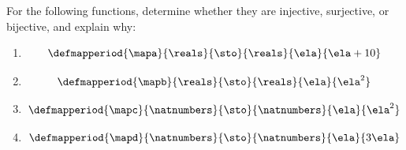 \begin{marginfigure}
    \centering
    \caption{An  function.}
    \label{fig:inj-function}
\end{marginfigure}

\begin{marginfigure}
    \centering
    \caption{A  function.}
    \label{fig:surj-function}
\end{marginfigure}

\begin{exercise}
    For the following functions, determine whether they are injective, surjective, or bijective, and explain why:
    \begin{enumerate}
        \item
              \begin{equation*}
                  \defmapperiod{\mapa}{\reals}{\sto}{\reals}{\ela}{\ela + 10}
              \end{equation*}
        \item
              \begin{equation*}
                  \defmapperiod{\mapb}{\reals}{\sto}{\reals}{\ela}{\ela^2}
              \end{equation*}
        \item
              \begin{equation*}
                  \defmapperiod{\mapc}{\natnumbers}{\sto}{\natnumbers}{\ela}{\ela^2}
              \end{equation*}
        \item
              \begin{equation*}
                  \defmapperiod{\mapd}{\natnumbers}{\sto}{\natnumbers}{\ela}{3\ela}
              \end{equation*}
    \end{enumerate}
\end{exercise}

